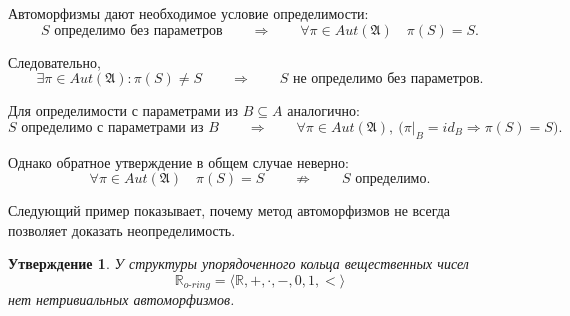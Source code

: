 \documentclass[12pt,a4paper,oneside,openany]{book}
\theoremstyle{definition}
\theoremstyle{plain}
\newtheorem{proposition}{Утверждение}[chapter]
\theoremstyle{remark}
\begin{document}
Автоморфизмы дают необходимое условие определимости:
\[
S\text{ определимо без параметров}
\qquad
\Longrightarrow
\qquad
\forall \pi\in Aut(\mathfrak A)\quad \pi(S)=S.
\]

Следовательно,
\[
\exists \pi\in Aut(\mathfrak A):\pi(S)\ne S
\qquad
\Longrightarrow
\qquad
S\text{ не определимо без параметров}.
\]

Для определимости с параметрами из $B\subseteq A$ аналогично:
\[
S\text{ определимо с параметрами из }B
\qquad
\Longrightarrow
\qquad
\forall \pi\in Aut(\mathfrak A),\ 
\bigl(\pi|_B=id_B \Rightarrow \pi(S)=S\bigr).
\]

Однако обратное утверждение в общем случае неверно:
\[
\forall \pi\in Aut(\mathfrak A)\quad \pi(S)=S
\qquad
\not\Longrightarrow
\qquad
S\text{ определимо}.
\]

Следующий пример показывает, почему метод автоморфизмов не всегда позволяет доказать неопределимость.

\begin{proposition}
У структуры упорядоченного кольца вещественных чисел
\[
\mathbb R_{o\text{-}ring}
=
\langle\mathbb R,+,\cdot,-,0,1,<\rangle
\]
нет нетривиальных автоморфизмов.
\end{proposition}
\end{document}
